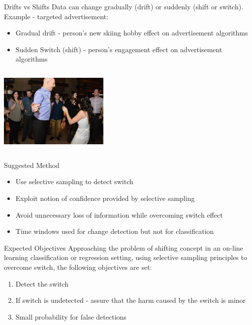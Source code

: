\documentclass{beamer}
\begin{document}
\begin{frame}{Drifts vs Shifts}
Data can change gradually (drift) or suddenly (shift or switch). \newline\newline
Example - targeted advertisement:
\begin{itemize}
\item Gradual drift -  person's new skiing hobby effect on advertisement algorithms 
\item  Sudden Switch (shift)  - person's engagement effect on advertisement algorithms 
\end{itemize}
\begin{center}
\includegraphics[height=1.7in,width=2.1in]{haim.jpg}
\end{center}
\end{frame}

\begin{frame}{Suggested Method}
\begin{itemize}
\item Use selective sampling to detect switch\newline
\item Exploit notion of confidence provided by selective sampling\newline
\item Avoid unnecessary loss of information while overcoming switch effect\newline
\item Time windows used for change detection but not for classification\newline
\end{itemize}
\end{frame}

\begin{frame}{Expected Objectives}
Approaching the problem of shifting concept in an on-line learning classification or regression setting, using selective sampling principles to overcome switch, the following objectives are set:\newline
\begin{enumerate}
\item Detect the switch\newline
\item If switch is undetected - assure that the harm caused by the switch is minor\newline
\item Small probability for false detections
\end{enumerate}
\end{frame}
\end{document}
